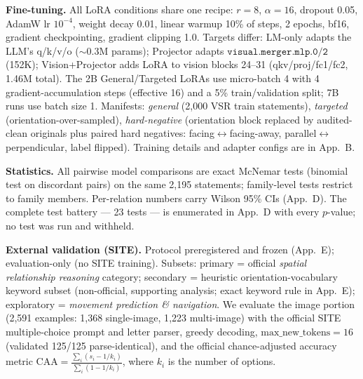 \textbf{Fine-tuning.} All LoRA conditions share one recipe: $r{=}8$, $\alpha{=}16$,
dropout 0.05, AdamW lr $10^{-4}$, weight decay 0.01, linear warmup 10\% of steps,
2 epochs, bf16, gradient checkpointing, gradient clipping 1.0. Targets differ:
LM-only adapts the LLM's q/k/v/o ($\sim$0.3M params); Projector adapts
$\texttt{visual.merger.mlp.0/2}$ (152K); Vision+Projector adds LoRA to vision
blocks 24--31 (qkv/proj/fc1/fc2, 1.46M total). The 2B General/Targeted LoRAs use
micro-batch 4 with 4 gradient-accumulation steps (effective 16) and a 5\%
train/validation split; 7B runs use batch size 1. Manifests: \emph{general}
(2{,}000 VSR train statements), \emph{targeted} (orientation-over-sampled),
\emph{hard-negative} (orientation block replaced by audited-clean originals plus
paired hard negatives: facing$\leftrightarrow$facing-away,
parallel$\leftrightarrow$perpendicular, label flipped). Training details and
adapter configs are in App.~B.

\textbf{Statistics.} All pairwise model comparisons are exact McNemar tests
(binomial test on discordant pairs) on the same 2{,}195 statements; family-level
tests restrict to family members. Per-relation numbers carry Wilson 95\% CIs
(App.~D). The complete test battery --- 23 tests --- is enumerated
in App.~D with every $p$-value; no test was run and withheld.

\textbf{External validation (SITE).} Protocol preregistered and frozen
(App.~E); evaluation-only (no SITE training). Subsets: primary =
official \emph{spatial relationship reasoning} category; secondary = heuristic
orientation-vocabulary keyword subset (non-official, supporting analysis; exact
keyword rule in App.~E); exploratory = \emph{movement prediction
\& navigation}. We evaluate the image portion (2{,}591 examples: 1{,}368
single-image, 1{,}223 multi-image) with the official SITE multiple-choice prompt
and letter parser, greedy decoding, $\mathrm{max\_new\_tokens}{=}16$ (validated
125/125 parse-identical), and the official chance-adjusted accuracy metric
$\mathrm{CAA} = \frac{\sum_i (s_i - 1/k_i)}{\sum_i (1 - 1/k_i)}$, where $k_i$ is
the number of options.
